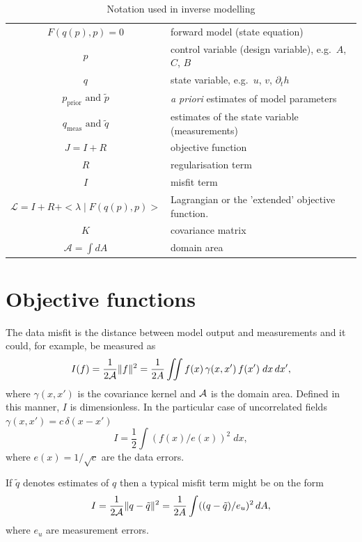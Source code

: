 \documentclass[10pt,a4paper]{book}
\newcommand{\p}{\partial}
\begin{document}
\begin{table}[tb]
\caption{\label{tab:inv} Notation used in inverse modelling}
\begin{center}
\begin{tabular}{cl}
\hline
$F(q(p),p)=0$ & forward model (state equation) \\
$p$ & control variable (design variable), e.g.\ $A$, $C$, $B$ \\
$q$ & state variable, e.g.\ $u$, $v$, $\p_t h$\\
$p_{\mathrm{prior}}  \text{ and } \tilde{p}$   & {\it a priori} estimates of model parameters\\
$q_{\mathrm{meas}} \text{ and } \tilde{q}$ & estimates of the state variable (measurements) \\  
$J=I+R$ & objective function\\
$R$ & regularisation term\\
$I$ & misfit term\\
$\mathcal{L} = I + R + <\lambda \mid F(q(p),p) > $ & Lagrangian or the 'extended' objective function. \\
$K$ & covariance matrix \\
$\mathcal{A}= \int dA$   & domain area \\
\hline
\end{tabular}
\end{center}
\end{table}


\section{Objective functions}


The data misfit is the distance between model output and measurements and
it could, for example, be measured as
\begin{equation}
I(f) = \frac{1}{2 \cal{A}} \| f \|^2 = \frac{1}{2A} \iint  f(x) \, \gamma(x,x') \, f(x')\; dx \, dx' ,
\label{eq:O1}
\end{equation}
where $\gamma(x,x')$ is the covariance kernel and $\cal{A}$ is the
domain area. Defined in this manner, $I$ is dimensionless. In the
particular case of uncorrelated fields
$\gamma(x,x')= c \,\delta(x-x')$
\begin{equation}
I =\frac{1}{2} \int  (f(x)/e(x))^2\; dx  ,
\label{eq:O2}
\end{equation}
where $e(x)=1/\sqrt{c}$ are the data errors. 

If $\tilde{q}$ denotes estimates of $q$ then a typical misfit term might be on the form
\[
I= \frac{1}{2 \cal{A}} \| q-\tilde{q} \|^2 = \frac{1}{2A} \int  ((q-\tilde{q})/e_u)^2 \, dA ,
\]
where $e_u$ are measurement errors.
\end{document}
